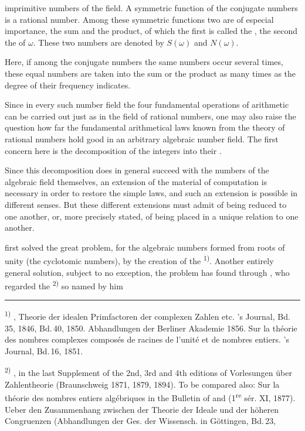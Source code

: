 
imprimitive numbers of the field. A symmetric function of the conjugate
numbers is a rational number. Among these symmetric functions two are of
especial importance, the sum and the product, of which the first is called
the , the second the  of $\omega$. These two
numbers are denoted by $S(\omega)$ and $N(\omega)$.

Here, if among the conjugate numbers the same numbers occur several times,
these equal numbers are taken into the sum or the product as many times as
the degree of their frequency indicates.

Since in every such number field the four fundamental operations of
arithmetic can be carried out just as in the field of rational numbers, one
may also raise the question how far the fundamental arithmetical laws known
from the theory of rational numbers hold good in an arbitrary algebraic
number field. The first concern here is the decomposition of the integers
into their .

Since this decomposition does in general  succeed with the
numbers of the algebraic field themselves, an extension of the material of
computation is necessary in order to restore the simple laws, and such an
extension is possible in different senses. But these different extensions
must admit of being reduced to one another, or, more precisely stated, of
being placed in a unique relation to one another.

 first solved the great problem, for the algebraic numbers
formed from roots of unity (the cyclotomic numbers), by the creation of the
\textsuperscript{1)}. Another entirely general
solution, subject to no exception, the problem has found through
, who regarded the \textsuperscript{2)} so named by him

\vspace{1em}\hrule\vspace{0.5em}

\noindent\textsuperscript{1)} , Theorie der idealen
Primfactoren der complexen Zahlen etc. 's Journal, Bd.\,35, 1846,
Bd.\,40, 1850. Abhandlungen der Berliner Akademie 1856. Sur la th\'eorie des
nombres complexes compos\'es de racines de l'unit\'e et de nombres entiers.
's Journal, Bd.\,16, 1851.

\noindent\textsuperscript{2)} , in the last Supplement of
the 2nd, 3rd and 4th editions of  Vorlesungen \"uber
Zahlentheorie (Braunschweig 1871, 1879, 1894). To be compared also: Sur la
th\'eorie des nombres entiers alg\'ebriques in the Bulletin of
 and  (1\textsuperscript{re} s\'er. XI,
1877). Ueber den Zusammenhang zwischen der Theorie der Ideale und der
h\"oheren Congruenzen (Abhandlungen der Ges. der Wissensch. in G\"ottingen,
Bd.\,23,
